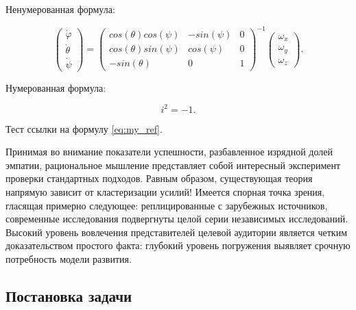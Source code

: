 \documentclass[a4paper,article,14pt]{extarticle}
\begin{document}
    Ненумерованная формула:

    \begin{equation}
        \begin{pmatrix}
            \dot{\varphi}\\ \dot{\theta} \\ \dot{\psi}
        \end{pmatrix}
        = \begin{pmatrix}
              cos(\theta)cos(\psi) & -sin(\psi) & 0 \\
              cos(\theta)sin(\psi) & cos(\psi)  & 0 \\
              -sin(\theta)         & 0          & 1
        \end{pmatrix}^{-1}
        \begin{pmatrix}
            \omega_x\\ \omega_y \\ \omega_z
        \end{pmatrix}.
    \end{equation}

    Нумерованная формула:

    \begin{equation}
        i^2 = -1.
        \label{eq:my_ref}
    \end{equation}

    Тест ссылки на формулу \ref{eq:my_ref}.

    Принимая во внимание показатели успешности, разбавленное изрядной долей эмпатии, рациональное мышление представляет собой интересный эксперимент проверки стандартных подходов. Равным образом, существующая теория напрямую зависит от кластеризации усилий! Имеется спорная точка зрения, гласящая примерно следующее: реплицированные с зарубежных источников, современные исследования подвергнуты целой серии независимых исследований. Высокий уровень вовлечения представителей целевой аудитории является четким доказательством простого факта: глубокий уровень погружения выявляет срочную потребность модели развития.

    \subsection{Постановка задачи}
\end{document}
